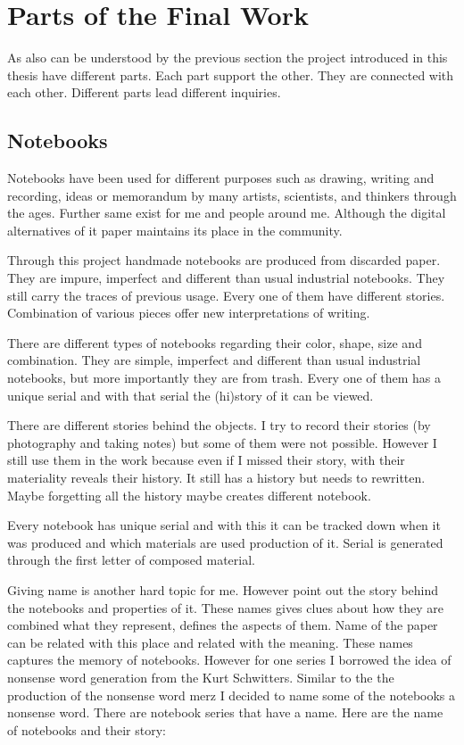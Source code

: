 %
%
\section{Parts of the Final Work}
As also can be understood by the previous section the project introduced in this thesis have different parts. Each part support the other. They are connected with each other. Different parts lead different inquiries.





%
%
\subsection{Notebooks}

Notebooks have been used for different purposes such as drawing, writing and recording, ideas or memorandum by many artists, scientists, and thinkers through the ages. Further same exist for me and people around me. Although the digital alternatives of it paper maintains its place in the community.

Through this project handmade notebooks are produced from discarded paper. They are impure, imperfect and different than usual industrial notebooks. They still carry the traces of previous usage. Every one of them have different stories. Combination of various pieces offer new interpretations of writing.

There are different types of notebooks regarding their color, shape, size and combination. They are simple, imperfect and different than usual industrial notebooks, but more importantly they are from trash. Every one of them has a unique serial and with that serial the (hi)story of it can be viewed.

There are different stories behind the objects. I try to record their stories (by photography and taking notes) but some of them were not possible. However I still use them in the work because even if I missed their story, with their materiality reveals their history. It still has a history but needs to rewritten. Maybe forgetting all the history maybe creates different notebook.

Every notebook has unique serial and with this it can be tracked down when it was produced and which materials are used production of it. Serial is generated through the first letter of composed material. 

Giving name is another hard topic for me. However point out the story behind the notebooks and properties of it. These names gives clues about how they are combined what they represent, defines the aspects of them. Name of the paper can be related with this place and related with the meaning. These names captures the memory of notebooks. However for one series I borrowed the idea of nonsense word generation from the Kurt Schwitters. Similar to the the production of the nonsense word merz I decided to name some of the notebooks a nonsense word. There are notebook series that have a name. Here are the name of notebooks and their story:

